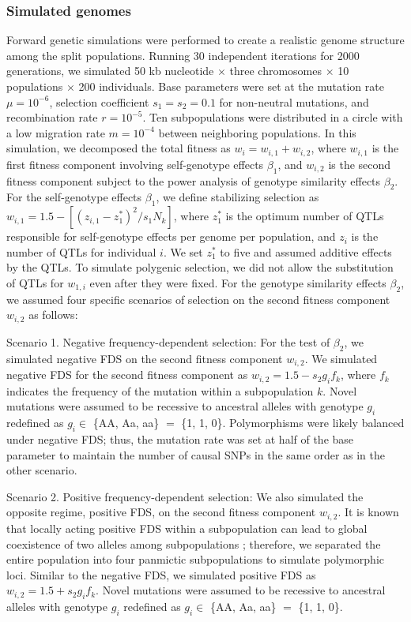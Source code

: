 \documentclass[12pt,]{article}
\begin{document}
\subsubsection{Simulated genomes}
Forward genetic simulations were performed to create a realistic genome structure among the split populations. Running 30 independent iterations for 2000 generations, we simulated 50 kb nucleotide $\times$ three chromosomes $\times$ 10 populations $\times$ 200 individuals. Base parameters were set at the mutation rate $\mu = 10^{-6}$, selection coefficient $s_1=s_2=0.1$ for non-neutral mutations, and recombination rate $r=10^{-5}$. Ten subpopulations were distributed in a circle with a low migration rate $m=10^{-4}$ between neighboring populations. In this simulation, we decomposed the total fitness as $w_i = w_{i,1} + w_{i,2}$, where $w_{i,1}$ is the first fitness component involving self-genotype effects $\beta_1$, and $w_{i,2}$ is the second fitness component subject to the power analysis of genotype similarity effects $\beta_2$. For the self-genotype effects $\beta_1$, we define stabilizing selection as $w_{i,1} = 1.5 - [(z_{i,1} - z_1^*)^2 / s_1N_k]$, where $z_1^*$ is the optimum number of QTLs responsible for self-genotype effects per genome per population, and $z_i$ is the number of QTLs for individual $i$. We set $z_1^*$ to five and assumed additive effects by the QTLs. To simulate polygenic selection, we did not allow the substitution of QTLs for $w_{1,i}$ even after they were fixed. For the genotype similarity effects $\beta_2$, we assumed four specific scenarios of selection on the second fitness component $w_{i,2}$ as follows: 

Scenario 1. Negative frequency-dependent selection: For the test of $\beta_2$, we simulated negative FDS on the second fitness component $w_{i,2}$. We simulated negative FDS for the second fitness component as $w_{i,2} = 1.5 - s_ 2 g _if_k$, where $f_k$ indicates the frequency of the mutation within a subpopulation $k$. Novel mutations were assumed to be recessive to ancestral alleles with genotype $g_i$ redefined as $g_i \in$ \{AA, Aa, aa\} $=$ \{1, 1, 0\}. Polymorphisms were likely balanced under negative FDS; thus, the mutation rate was set at half of the base parameter to maintain the number of causal SNPs in the same order as in the other scenario.

Scenario 2. Positive frequency-dependent selection: We also simulated the opposite regime, positive FDS, on the second fitness component $w_{i,2}$. It is known that locally acting positive FDS within a subpopulation can lead to global coexistence of two alleles among subpopulations \citep{molofsky2001coexistence}; therefore, we separated the entire population into four panmictic subpopulations to simulate polymorphic loci. Similar to the negative FDS, we simulated positive FDS as $w_{i,2} = 1.5 + s_ 2 g _if_k$. Novel mutations were assumed to be recessive to ancestral alleles with genotype $g_i$ redefined as $g_i \in$ \{AA, Aa, aa\} $=$ \{1, 1, 0\}. 
\end{document}
